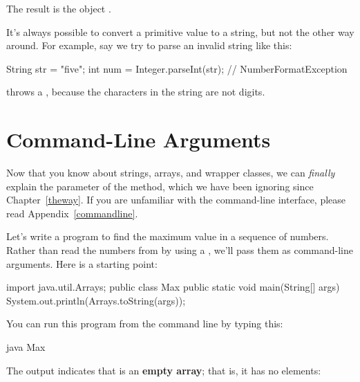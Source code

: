 The result is the  object .


It's always possible to convert a primitive value to a string, but not the other way around.  For example, say we try to parse an invalid string like this:

\begin{code}
String str = "five";
int num = Integer.parseInt(str);  // NumberFormatException
\end{code}

 throws a , because the characters in the string  are not digits.


\section{Command-Line Arguments}


Now that you know about strings, arrays, and wrapper classes, we can {\em finally} explain the  parameter of the  method, which we have been ignoring since Chapter~\ref{theway}.
If you are unfamiliar with the command-line interface, please read Appendix~\ref{commandline}.

Let's write a program to find the maximum value in a sequence of numbers.
Rather than read the numbers from  by using a , we'll pass them as command-line arguments.
Here is a starting point:

\begin{code}
import java.util.Arrays;
public class Max {
    public static void main(String[] args) {
        System.out.println(Arrays.toString(args));
    }
}
\end{code}

You can run this program from the command line by typing this:

\begin{stdout}
java Max
\end{stdout}


The output indicates that  is an {\bf empty array}; that is, it has no elements:

\begin{stdout}
[]
\end{stdout}

